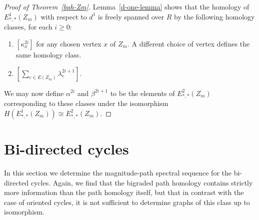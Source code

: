 \documentclass[a4paper, 11 pt, oneside, reqno]{amsart}
\numberwithin{lemma}{section}
\theoremstyle{definition}
\begin{document}
\begin{proof}[Proof of Theorem~\ref{bph-Zm}]
    Lemma~\ref{d-one-lemma} shows that the homology of 
    $E^1_{\ast,\ast}(Z_m)$ with respect to $d^1$
    is freely spanned over $R$ by the
    following homology classes, for each $i\geq 0$:
    \begin{enumerate}
        \item
        $[\kappa^{2i}_x]$ for any chosen vertex $x$ of $Z_m$.
        A different choice of vertex defines the same 
        homology class.
        \item
        $\left[\sum_{e\in E(Z_m)} \lambda^{2i+1}_e\right]$.
    \end{enumerate}
    We may now define $\alpha^{2i}$ and $\beta^{2i+1}$ to be
    the elements of $E^2_{\ast,\ast}(Z_m)$ corresponding to 
    these classes under the isomorphism
    $H(E^1_{\ast,\ast}(Z_m))\cong E^2_{\ast,\ast}(Z_m)$.
\end{proof}


\section{Bi-directed cycles}
\label{sec:mn_cycles}

In this section we determine the magnitude-path spectral sequence
for the bi-directed cycles.
Again, we find that the bigraded path homology contains strictly
more information than the path homology itself,
but that in contrast with the case of oriented cycles, it is not
sufficient to determine graphs of this class up to isomorphism.
\end{document}
